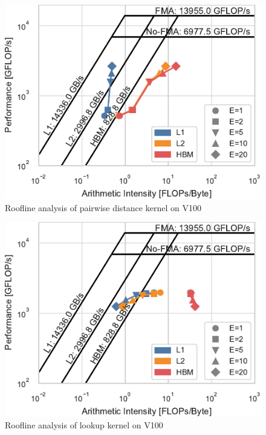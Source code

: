 \documentclass[conference]{IEEEtran}
\begin{document}
\begin{figure}
    \centering
    \includegraphics{figs/roofline_distances_v100}
    \caption{Roofline analysis of pairwise distance kernel on V100}%
    \label{fig:architecture}
\end{figure}

\begin{figure}
    \centering
    \includegraphics{figs/roofline_lookup_v100}
    \caption{Roofline analysis of lookup kernel on V100}%
    \label{fig:architecture}
\end{figure}
\end{document}
